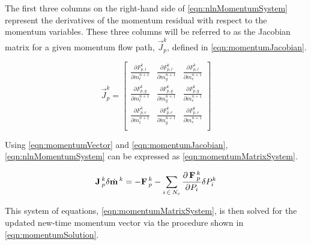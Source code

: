 The first three columns on the right-hand side of \eqref{eqn:nlnMomentumSystem} represent the derivatives of the momentum residual with respect to the momentum variables.
These three columns will be referred to as the Jacobian matrix for a given momentum flow path, $\vec{J}^{k}_{p}$, defined in \eqref{eqn:momentumJacobian}.

\begin{equation}
\label{eqn:momentumJacobian}
\vec{J}^{k}_{p} = 
\begin{bmatrix}
\frac{\partial F^{k}_{p,l}}{\partial \dot{m}^{n+1}_{l}} & \frac{\partial F^{k}_{p,l}}{\partial \dot{m}^{n+1}_{g}} & \frac{\partial F^{k}_{p,l}}{\partial \dot{m}^{n+1}_{e}} \\
\frac{\partial F^{k}_{p,g}}{\partial \dot{m}^{n+1}_{l}} & \frac{\partial F^{k}_{p,g}}{\partial \dot{m}^{n+1}_{g}} & \frac{\partial F^{k}_{p,g}}{\partial \dot{m}^{n+1}_{e}} \\
\frac{\partial F^{k}_{p,e}}{\partial \dot{m}^{n+1}_{l}} & \frac{\partial F^{k}_{p,e}}{\partial \dot{m}^{n+1}_{g}} & \frac{\partial F^{k}_{p,e}}{\partial \dot{m}^{n+1}_{e}} \\
\end{bmatrix}
\end{equation}

Using \eqref{eqn:momentumVector} and \eqref{eqn:momentumJacobian}, \eqref{eqn:nlnMomentumSystem} can be expressed as \eqref{eqn:momentumMatrixSystem}.

\begin{equation}
\label{eqn:momentumMatrixSystem}
\vec{J}^{k}_{p} \delta \momVec{}^{k}  = - \vec{F}^{k}_{p} - \sum_{i\, \in \, N_{c}} \frac{\partial\, \vec{F}^{k}_{p}}{\partial P_{i}} \delta P_{i}^{k}
\end{equation}

This system of equations, \eqref{eqn:momentumMatrixSystem}, is then solved for the updated new-time momentum vector via the procedure shown in \eqref{eqn:momentumSolution}.

